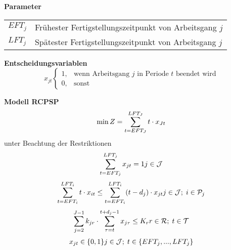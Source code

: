 \documentclass[a4paper,12pt,normalheadings,footexclude,headinclude,liststotoc,nochapterprefix,onecolumn,oneside,parskip,pointlessnumbers]{scrreprt}
\begin{document}
\textbf{Parameter}
\begin{table}[h!]
    \vspace*{-3mm}
    \hspace*{2mm}
  \renewcommand{\arraystretch}{1,5}
   \begin{tabular}{ll}  %
$EFT_{j}$	& Frühester Fertigstellungszeitpunkt von Arbeitsgang $j$\\
$LFT_{j}$	& Spätester Fertigstellungszeitpunkt von Arbeitsgang $j$\\
	\end{tabular}
\end{table}

\textbf{Entscheidungsvariablen}
\[x_{jt}\begin{cases}
1, & \text{wenn Arbeitsgang $j$ in Periode $t$ beendet wird}\\
0, & \text{sonst} 
\end{cases}\]

\textbf{Modell RCPSP}
\begin{eqnarray} \label{Ziel}
\min Z = \sum_{t=EFT_{J}}^{LFT_{J}}t \cdot x_{Jt}\hfill  
\end{eqnarray}
unter Beachtung der Restriktionen
\begin{multline} \label{N1}
\sum_{t=EFT_{j}}^{LFT_{j}} x_{jt} = 1
\hfill   j \in \mathcal{J}
\end{multline}\vspace{-3.0ex}
\begin{multline} \label{N2}
\sum_{t=EFT_{i}}^{LFT_{i}}t \cdot x_{it} \leq \sum_{t=EFT_{i}}^{LFT_{i}}(t - d_{j}) \cdot x_{jt}
\hfill   j \in \mathcal{J};\; i \in \mathcal{P}_{j}
\end{multline}\vspace{-3.0ex}
\begin{multline} \label{N3}
\sum_{j=2}^{J-1}k_ {jr} \cdot \sum_{\tau=t}^{t+d_{j}-1}x_{j\tau}  \leq K_{r}
\hfill   r \in \mathcal{R};\; t \in \mathcal{T}
\end{multline}\vspace{-3.0ex}
\begin{multline} \label{N4}
x_{jt} \in \{0,1\}
\hfill   j \in \mathcal{J};\; t \in \{EFT_{j},...,LFT_{j}\}\end{multline}\vspace{-6.0ex}
\end{document}
